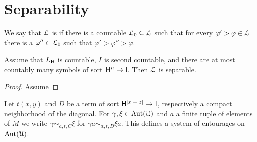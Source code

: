 \documentclass[10pt,oneside]{amsproc}
\renewcommand*{\emph}[1]{%
   \smash{\tikz[baseline]\node[rectangle, fill=teal!25, rounded corners, inner xsep=0.5ex, inner ysep=0.2ex, anchor=base, minimum height = 2.7ex]{#1};}}
\begin{document}



\section{Separability}\label{separability}

We say that ${\EuScript L}$ is \emph{separable\/} if there is a countable  ${\EuScript L}_0\subseteq{\EuScript L}$ such that for every $\varphi'>\varphi\in{\EuScript L}$ there is a $\varphi''\in {\EuScript L}_0$ such that  $\varphi'>\varphi''>\varphi$.


\begin{proposition}
  Assume that $L_{\sf H}$ is countable, $I$ is second countable, and there are at most countably many symbols of sort ${\sf H}^n\to{\sf I}$.
  Then ${\EuScript L}$ is separable.
\end{proposition}
\begin{proof}
  Assume 
\end{proof}




\hrulefill

Let $t(x,y)$ and $D$ be a term of sort ${\sf H}^{|x|+|z|}\to {\sf I}$, respectively a compact neighborhood of the diagonal.
For $\gamma,\xi\in{\rm Aut}({\EuScript U})$ and $a$ a finite tuple of elements of $M$ we write $\gamma\sim_{a,t,C}\xi$ for $\gamma a\sim_{a,t,D} \xi a$.
This defines a system of entourages on ${\rm Aut}({\EuScript U})$.
\end{document}
